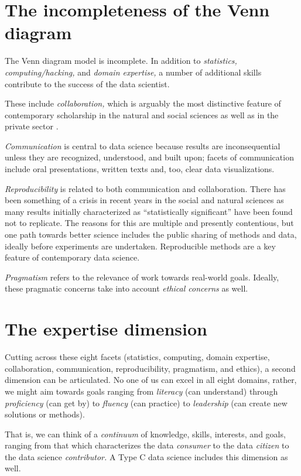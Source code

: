 \documentclass[]{book}
\theoremstyle{definition}
\theoremstyle{definition}
\theoremstyle{definition}
\theoremstyle{remark}
\begin{document}
\section{The incompleteness of the Venn
diagram}\label{the-incompleteness-of-the-venn-diagram}

The Venn diagram model is incomplete. In addition to \emph{statistics,
computing/hacking,} and \emph{domain expertise,} a number of additional
skills contribute to the success of the data scientist.

These include \emph{collaboration,} which is arguably the most
distinctive feature of contemporary scholarship in the natural and
social sciences as well as in the private sector
\citep{isaacson2014innovators}.

\emph{Communication} is central to data science because results are
inconsequential unless they are recognized, understood, and built upon;
facets of communication include oral presentations, written texts and,
too, clear data visualizations.

\emph{Reproducibility} is related to both communication and
collaboration. There has been something of a crisis in recent years in
the social and natural sciences as many results initially characterized
as ``statistically significant'' have been found not to replicate. The
reasons for this are multiple and presently contentious, but one path
towards better science includes the public sharing of methods and data,
ideally before experiments are undertaken. Reproducible methods are a
key feature of contemporary data science.

\emph{Pragmatism} refers to the relevance of work towards real-world
goals. Ideally, these pragmatic concerns take into account \emph{ethical
concerns} as well.

\section{The expertise dimension}\label{the-expertise-dimension}

Cutting across these eight facets (statistics, computing, domain
expertise, collaboration, communication, reproducibility, pragmatism,
and ethics), a second dimension can be articulated. No one of us can
excel in all eight domains, rather, we might aim towards goals ranging
from \emph{literacy} (can understand) through \emph{proficiency} (can
get by) to \emph{fluency} (can practice) to \emph{leadership} (can
create new solutions or methods).

That is, we can think of a \emph{continuum} of knowledge, skills,
interests, and goals, ranging from that which characterizes the data
\emph{consumer} to the data \emph{citizen} to the data science
\emph{contributor.} A Type C data science includes this dimension as
well.
\end{document}

